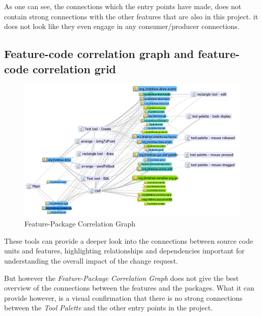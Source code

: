 As one can see, the connections which the entry points have made, does not contain strong connections
with the other features that are also in this project. it does not look like they even engage in any consumer/producer connections.

\subsection{Feature-code correlation graph and feature-code correlation grid}

\begin{figure}[H]
    \centering
    \includegraphics[width=\linewidth]{pic/Feature-Package Correlation Graph new.png}
    \caption{Feature-Package Correlation Graph}
    \label{fig:Feature-Package Correlation Graph}
\end{figure}

These tools can provide a deeper look into the connections between source code units and features,
highlighting relationships and dependencies important for understanding the overall impact of the change request.

But however the \textit{Feature-Package Correlation Graph} does not give the best overview of the connections between the features and the packages.
What it can provide however, is a visual confirmation that there is no strong connections between the \textit{Tool Palette} and the other entry points in the project.



